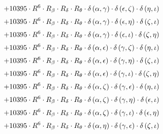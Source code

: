 \begin{subequations}
\begin{gather}
 \\[0.2em] \notag 		 + 10395 \cdot R^{6} \cdot R_{\beta{}} \cdot R_{\delta{}} \cdot R_{\theta{}} \cdot \delta{}\left(\alpha{}, \gamma{}\right) \cdot \delta{}\left(\epsilon{}, \zeta{}\right) \cdot \delta{}\left(\eta{}, \iota{}\right) 
 \\[0.2em] \notag 		 + 10395 \cdot R^{6} \cdot R_{\beta{}} \cdot R_{\delta{}} \cdot R_{\theta{}} \cdot \delta{}\left(\alpha{}, \gamma{}\right) \cdot \delta{}\left(\epsilon{}, \eta{}\right) \cdot \delta{}\left(\zeta{}, \iota{}\right) 
 \\[0.2em] \notag 		 + 10395 \cdot R^{6} \cdot R_{\beta{}} \cdot R_{\delta{}} \cdot R_{\theta{}} \cdot \delta{}\left(\alpha{}, \gamma{}\right) \cdot \delta{}\left(\epsilon{}, \iota{}\right) \cdot \delta{}\left(\zeta{}, \eta{}\right) 
 \\[0.2em] \notag 		 + 10395 \cdot R^{6} \cdot R_{\beta{}} \cdot R_{\delta{}} \cdot R_{\theta{}} \cdot \delta{}\left(\alpha{}, \epsilon{}\right) \cdot \delta{}\left(\gamma{}, \zeta{}\right) \cdot \delta{}\left(\eta{}, \iota{}\right) 
 \\[0.2em] \notag 		 + 10395 \cdot R^{6} \cdot R_{\beta{}} \cdot R_{\delta{}} \cdot R_{\theta{}} \cdot \delta{}\left(\alpha{}, \epsilon{}\right) \cdot \delta{}\left(\gamma{}, \eta{}\right) \cdot \delta{}\left(\zeta{}, \iota{}\right) 
 \\[0.2em] \notag 		 + 10395 \cdot R^{6} \cdot R_{\beta{}} \cdot R_{\delta{}} \cdot R_{\theta{}} \cdot \delta{}\left(\alpha{}, \epsilon{}\right) \cdot \delta{}\left(\gamma{}, \iota{}\right) \cdot \delta{}\left(\zeta{}, \eta{}\right) 
 \\[0.2em] \notag 		 + 10395 \cdot R^{6} \cdot R_{\beta{}} \cdot R_{\delta{}} \cdot R_{\theta{}} \cdot \delta{}\left(\alpha{}, \zeta{}\right) \cdot \delta{}\left(\gamma{}, \epsilon{}\right) \cdot \delta{}\left(\eta{}, \iota{}\right) 
 \\[0.2em] \notag 		 + 10395 \cdot R^{6} \cdot R_{\beta{}} \cdot R_{\delta{}} \cdot R_{\theta{}} \cdot \delta{}\left(\alpha{}, \zeta{}\right) \cdot \delta{}\left(\gamma{}, \eta{}\right) \cdot \delta{}\left(\epsilon{}, \iota{}\right) 
 \\[0.2em] \notag 		 + 10395 \cdot R^{6} \cdot R_{\beta{}} \cdot R_{\delta{}} \cdot R_{\theta{}} \cdot \delta{}\left(\alpha{}, \zeta{}\right) \cdot \delta{}\left(\gamma{}, \iota{}\right) \cdot \delta{}\left(\epsilon{}, \eta{}\right) 
 \\[0.2em] \notag 		 + 10395 \cdot R^{6} \cdot R_{\beta{}} \cdot R_{\delta{}} \cdot R_{\theta{}} \cdot \delta{}\left(\alpha{}, \eta{}\right) \cdot \delta{}\left(\gamma{}, \epsilon{}\right) \cdot \delta{}\left(\zeta{}, \iota{}\right) 

\end{gather}
\end{subequations}
